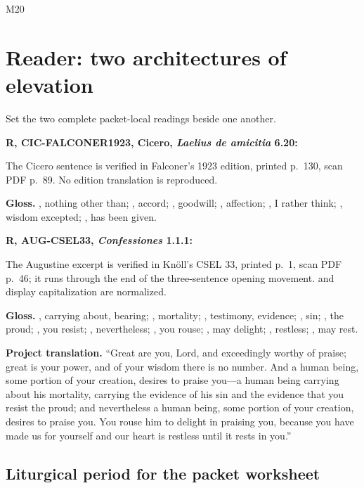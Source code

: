 \begin{courseunit}{M20}
\chapter{Reader: two architectures of elevation}

Set the two complete packet-local readings beside one another.

\textbf{R, CIC-FALCONER1923, Cicero, \textit{Laelius de amicitia} 6.20:}

\ReaderCiceroFriendship

The Cicero sentence is verified in Falconer's 1923 edition, printed p.~130,
scan PDF p.~89.  No edition translation is reproduced.

\textbf{Gloss.} , nothing other than;
, accord; , goodwill;
, affection; , I rather think;
, wisdom excepted; , has been given.

\textbf{R, AUG-CSEL33, \textit{Confessiones} 1.1.1:}
\ReaderAugustineOpening

The Augustine excerpt is verified in Knöll's CSEL 33, printed p.~1, scan PDF
p.~46; it runs through the end of the three-sentence opening movement.
 and display capitalization are normalized.

\textbf{Gloss.} , carrying about, bearing;
, mortality; , testimony, evidence;
, sin; , the proud; , you
resist; , nevertheless; , you rouse;
, may delight; , restless;
, may rest.

\textbf{Project translation.} ``Great are you, Lord, and exceedingly worthy
of praise; great is your power, and of your wisdom there is no number. And a
human being, some portion of your creation, desires to praise you---a human
being carrying about his mortality, carrying the evidence of his sin and the
evidence that you resist the proud; and nevertheless a human being, some
portion of your creation, desires to praise you. You rouse him to delight in
praising you, because you have made us for yourself and our heart is restless
until it rests in you.''

\section{Liturgical period for the packet worksheet}


\end{courseunit}
